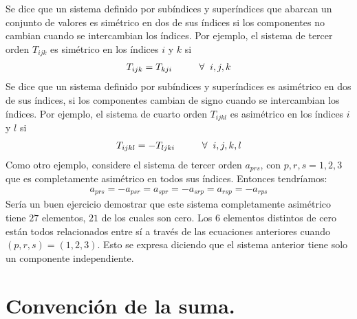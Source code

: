 Se dice que un sistema definido por subíndices y superíndices que abarcan un conjunto de valores es simétrico en dos de sus índices si los componentes no cambian cuando se intercambian los índices. Por ejemplo, el sistema de tercer orden $T_{ijk}$ es simétrico en los índices $i$ y $k$ si
\begin{align*}
T_{ijk} = T_{kji} \hspace{1cm} \forall \hspace{0.2cm} i, j, k
\end{align*}
Se dice que un sistema definido por subíndices y superíndices es asimétrico en dos de sus índices, si los componentes cambian de signo cuando se intercambian los índices. Por ejemplo, el sistema de cuarto orden $T_{ijkl}$ es asimétrico en los índices $i$ y $l$ si
\begin{align*}
T_{ijkl} = -T_{ljki} \hspace{1cm} \forall \hspace{0.2cm} i, j, k, l
\end{align*}
Como otro ejemplo, considere el sistema de tercer orden $a_{prs}$, con $p, r, s = 1, 2, 3$ que es completamente asimétrico en todos sus índices. Entonces tendríamos:
\begin{align*}
a_{prs} = - a_{psr} = a_{spr} = -a_{srp} = a_{rsp} = -a_{rps}
\end{align*}
Sería un buen ejercicio demostrar que este sistema completamente asimétrico tiene $27$ elementos, $21$ de los cuales son cero. Los $6$ elementos distintos de cero están todos relacionados entre sí a través de las ecuaciones anteriores cuando $(p, r, s) = (1, 2, 3)$. Esto se expresa diciendo que el sistema anterior tiene solo un componente independiente.

\section{Convención de la suma.}

